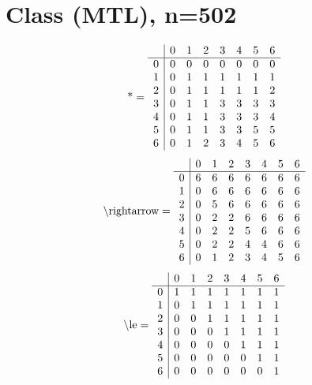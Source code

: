 \documentclass[11pt]{article}
\begin{document}
\section{Class (MTL), n=502}
\[\text{*} = 
\begin{array}{r | r r r r r r r}
 & 0 & 1 & 2 & 3 & 4 & 5 & 6 \\ \hline
0 & 0 & 0 & 0 & 0 & 0 & 0 & 0 \\
1 & 0 & 1 & 1 & 1 & 1 & 1 & 1 \\
2 & 0 & 1 & 1 & 1 & 1 & 1 & 2 \\
3 & 0 & 1 & 1 & 3 & 3 & 3 & 3 \\
4 & 0 & 1 & 1 & 3 & 3 & 3 & 4 \\
5 & 0 & 1 & 1 & 3 & 3 & 5 & 5 \\
6 & 0 & 1 & 2 & 3 & 4 & 5 & 6 \\
\end{array}
\]
\[\text{\textbackslash rightarrow} = 
\begin{array}{r | r r r r r r r}
 & 0 & 1 & 2 & 3 & 4 & 5 & 6 \\ \hline
0 & 6 & 6 & 6 & 6 & 6 & 6 & 6 \\
1 & 0 & 6 & 6 & 6 & 6 & 6 & 6 \\
2 & 0 & 5 & 6 & 6 & 6 & 6 & 6 \\
3 & 0 & 2 & 2 & 6 & 6 & 6 & 6 \\
4 & 0 & 2 & 2 & 5 & 6 & 6 & 6 \\
5 & 0 & 2 & 2 & 4 & 4 & 6 & 6 \\
6 & 0 & 1 & 2 & 3 & 4 & 5 & 6 \\
\end{array}
\]
\[\text{\textbackslash le} = 
\begin{array}{r | r r r r r r r}
 & 0 & 1 & 2 & 3 & 4 & 5 & 6 \\ \hline
0 & 1 & 1 & 1 & 1 & 1 & 1 & 1 \\
1 & 0 & 1 & 1 & 1 & 1 & 1 & 1 \\
2 & 0 & 0 & 1 & 1 & 1 & 1 & 1 \\
3 & 0 & 0 & 0 & 1 & 1 & 1 & 1 \\
4 & 0 & 0 & 0 & 0 & 1 & 1 & 1 \\
5 & 0 & 0 & 0 & 0 & 0 & 1 & 1 \\
6 & 0 & 0 & 0 & 0 & 0 & 0 & 1 \\
\end{array}
\]
\end{document}
